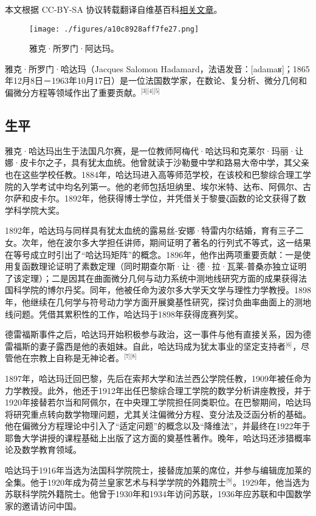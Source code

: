
本文根据 CC-BY-SA 协议转载翻译自维基百科\href{https://en.wikipedia.org/wiki/Jacques_Hadamard}{相关文章}。

\begin{figure}[ht]
\centering
\texttt{[image: ./figures/a10c8928aff7fe27.png]}
\caption{雅克·所罗门·阿达玛。} \label{fig_YKadm_1}
\end{figure}
雅克·所罗门·哈达玛（Jacques Salomon Hadamard，法语发音：[adamaʁ]；1865年12月8日－1963年10月17日）是一位法国数学家，在数论、复分析、微分几何和偏微分方程等领域作出了重要贡献。\(^\text{[3][4][5]}\)
\subsection{生平}
雅克·哈达玛出生于法国凡尔赛，是一位教师阿梅代·哈达玛和克莱尔·玛丽·让娜·皮卡尔之子，具有犹太血统。他曾就读于沙勒曼中学和路易大帝中学，其父亲也在这些学校任教。1884年，哈达玛进入高等师范学校，在该校和巴黎综合理工学院的入学考试中均名列第一。他的老师包括坦纳里、埃尔米特、达布、阿佩尔、古尔萨和皮卡尔。1892年，他获得博士学位，并凭借关于黎曼ζ函数的论文获得了数学科学院大奖。

1892年，哈达玛与同样具有犹太血统的露易丝-安娜·特雷内尔结婚，育有三子二女。次年，他在波尔多大学担任讲师，期间证明了著名的行列式不等式，这一结果在等号成立时引出了“哈达玛矩阵”的概念。1896年，他作出两项重要贡献：一是使用复函数理论证明了素数定理（同时期查尔斯·让·德·拉·瓦莱-普桑亦独立证明了该定理）；二是因其在曲面微分几何与动力系统中测地线研究方面的成果获得法国科学院的博尔丹奖。同年，他被任命为波尔多大学天文学与理性力学教授。1898年，他继续在几何学与符号动力学方面开展奠基性研究，探讨负曲率曲面上的测地线问题。凭借其累积性的工作，哈达玛于1898年获得庞赛列奖。

德雷福斯事件之后，哈达玛开始积极参与政治，这一事件与他有直接关系，因为德雷福斯的妻子露西是他的表姐妹。自此，哈达玛成为犹太事业的坚定支持者\(^\text{[6]}\)，尽管他在宗教上自称是无神论者。\(^\text{[7][8]}\)

1897年，哈达玛迁回巴黎，先后在索邦大学和法兰西公学院任教，1909年被任命为力学教授。此外，他还于1912年出任巴黎综合理工学院的数学分析讲座教授，并于1920年接替若尔当和阿佩尔，在中央理工学院担任同类职位。在巴黎期间，哈达玛将研究重点转向数学物理问题，尤其关注偏微分方程、变分法及泛函分析的基础。他在偏微分方程理论中引入了“适定问题”的概念以及“降维法”，并最终在1922年于耶鲁大学讲授的课程基础上出版了这方面的奠基性著作。晚年，哈达玛还涉猎概率论及数学教育领域。

哈达玛于1916年当选为法国科学院院士，接替庞加莱的席位，并参与编辑庞加莱的全集。他于1920年成为荷兰皇家艺术与科学学院的外籍院士\(^\text{[9]}\)。1929年，他当选为苏联科学院外籍院士。他曾于1930年和1934年访问苏联，1936年应苏联和中国数学家的邀请访问中国。

